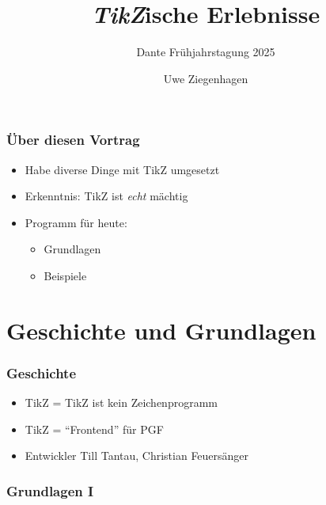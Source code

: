 \documentclass[14pt,ngerman]{beamer}
\author{Uwe Ziegenhagen}
\title{\textit{TikZ}ische Erlebnisse}
\subtitle{Dante Frühjahrstagung 2025}
\begin{document}
\begin{frame}

\maketitle

\end{frame}

\begin{frame}
\frametitle{Über diesen Vortrag}

\begin{itemize}
\item Habe diverse Dinge mit TikZ umgesetzt
\item Erkenntnis: TikZ ist \textit{echt} mächtig 
\item Programm für heute: 
\begin{itemize}
	\item Grundlagen
	\item Beispiele
\end{itemize}

\end{itemize}
\end{frame}

\section{Geschichte und Grundlagen} 

\begin{frame}
\frametitle{Geschichte}

\begin{itemize}
\item TikZ = TikZ ist kein Zeichenprogramm
\item TikZ = \enquote{Frontend} für PGF
\item Entwickler Till Tantau, Christian Feuersänger
\end{itemize}
\end{frame}

\begin{frame}
\frametitle{Grundlagen I}

\begin{center}
\end{center}


\end{frame}
\end{document}

